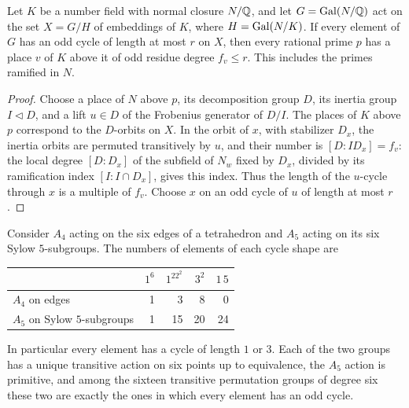 \begin{lemma}\label{dir:lem:oddresidue}
Let $K$ be a number field with normal closure $N/\mathbb{Q}$, and let $G=\operatorname{Gal}(N/\mathbb{Q})$ act on
the set $X=G/H$ of embeddings of $K$, where $H=\operatorname{Gal}(N/K)$. If every element of $G$ has
an odd cycle of length at most $r$ on $X$, then every rational prime $p$ has a place
$v$ of $K$ above it of odd residue degree $f_v\le r$. This includes the primes
ramified in $N$.
\end{lemma}

\begin{proof}
Choose a place of $N$ above $p$, its decomposition group $D$, its inertia group
$I\triangleleft D$, and a lift $u\in D$ of the Frobenius generator of $D/I$. The places
of $K$ above $p$ correspond to the $D$-orbits on $X$. In the orbit of $x$, with
stabilizer $D_x$, the inertia orbits are permuted transitively by $u$, and their number
is $[D:ID_x]=f_v$: the local degree $[D:D_x]$ of the subfield of $N_w$ fixed by $D_x$,
divided by its ramification index $[I:I\cap D_x]$, gives this index. Thus the length of
the $u$-cycle through $x$ is a multiple of $f_v$. Choose $x$ on an odd cycle of $u$ of
length at most $r$.
\end{proof}

\begin{lemma}\label{dir:lem:sextic}
Consider $A_4$ acting on the six edges of a tetrahedron and $A_5$ acting on its six
Sylow $5$-subgroups. The numbers of elements of each cycle shape are
\begin{center}
\begin{tabular}{lrrrr}
 & $1^6$ & $1^22^2$ & $3^2$ & $1\,5$\\
\hline
$A_4$ on edges & 1 & 3 & 8 & 0\\
$A_5$ on Sylow $5$-subgroups & 1 & 15 & 20 & 24
\end{tabular}
\end{center}
In particular every element has a cycle of length $1$ or $3$. Each of the two groups
has a unique transitive action on six points up to equivalence, the $A_5$ action is
primitive, and among the sixteen transitive permutation groups of degree six these two
are exactly the ones in which every element has an odd cycle.
\end{lemma}

